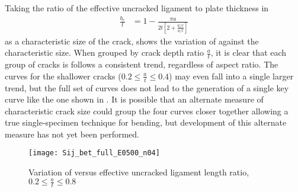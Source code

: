 Taking the ratio of the effective uncracked ligament to plate thickness in \cite{sharobeamlandes1994}
\begin{align}
\frac{b_e}{t} &= 1 - \frac{\pi a}{2t \left[ 2 + \frac{a/c}{a/t} \right]}
\end{align}
as a characteristic size of the crack,  shows the variation of \Sij against the characteristic size.
When grouped by crack depth ratio $\frac{a}{t}$, it is clear that each group of cracks is follows a consistent trend, regardless of aspect ratio.
The curves for the shallower cracks ($0.2 \leq \frac{a}{t} \leq 0.4$) may even fall into a single larger trend, but the full set of curves does not lead to the generation of a single key curve like the one shown in .
It is possible that an alternate measure of characteristic crack size could group the four curves closer together allowing a true single-specimen technique for bending, but development of this alternate measure has not yet been performed.
\begin{figure}[tbp]
\centering
\texttt{[image: Sij\_bet\_full\_E0500\_n04]}
\caption{Variation of \Sij versus effective uncracked ligament length ratio, \(0.2 \leq \frac{a}{t} \leq 0.8\) \label{fig:Sij_bet_full_E0500_n04}}
\end{figure}
